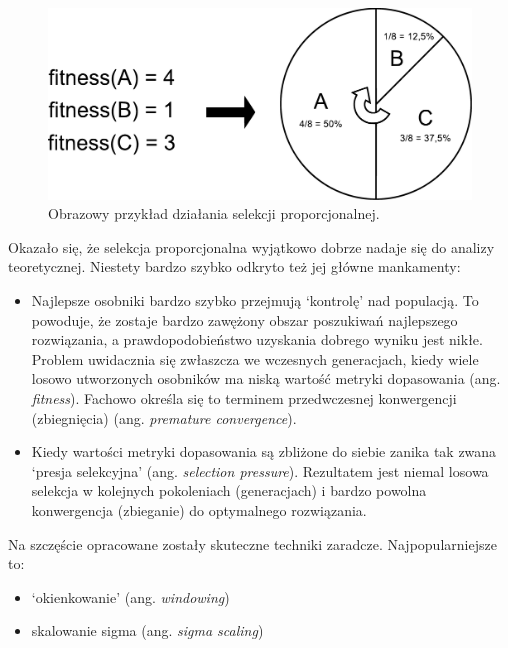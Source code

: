 \documentclass[a4paper,11pt]{article}
\begin{document}
    \begin{figure}[H]
        \label{fig:proportional_selection}
        \centering
        \includegraphics[width=\textwidth]{proportional_selection}
        \caption{Obrazowy przykład działania selekcji proporcjonalnej.}
    \end{figure}

    \bigskip

    Okazało się, że selekcja proporcjonalna wyjątkowo dobrze nadaje się do analizy teoretycznej. Niestety bardzo szybko odkryto też jej główne mankamenty\cite{IntroductionToEvolutionaryComputing2015}:
    \begin{itemize}
        \item Najlepsze osobniki bardzo szybko przejmują `kontrolę' nad populacją. To powoduje, że zostaje bardzo zawężony obszar poszukiwań najlepszego rozwiązania, a prawdopodobieństwo uzyskania dobrego wyniku jest nikłe. Problem uwidacznia się zwłaszcza we wczesnych generacjach, kiedy wiele losowo utworzonych osobników ma niską wartość metryki dopasowania (ang. \textit{fitness}). Fachowo określa się to terminem przedwczesnej konwergencji (zbiegnięcia) (ang. \textit{premature convergence}).
        \item Kiedy wartości metryki dopasowania są zbliżone do siebie zanika tak zwana `presja selekcyjna' (ang. \textit{selection pressure}). Rezultatem jest niemal losowa selekcja w kolejnych pokoleniach (generacjach) i bardzo powolna konwergencja (zbieganie) do optymalnego rozwiązania.
    \end{itemize}

    \bigskip

    \noindent
    \begin{minipage}[H]{\textwidth}
        \setlength\parindent{17pt} Na szczęście opracowane zostały skuteczne techniki zaradcze. Najpopularniejsze to:
        \begin{itemize}
            \item `okienkowanie' (ang. \textit{windowing})
            \item skalowanie sigma (ang. \textit{sigma scaling})
        \end{itemize}
    \end{minipage}
\end{document}
